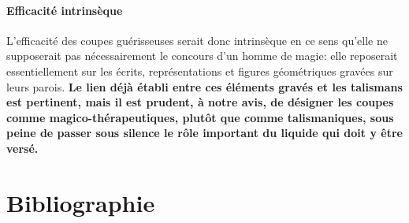 \paragraph{Efficacité intrinsèque}
L'efficacité des coupes guérisseuses serait donc intrinsèque en ce sens qu'elle ne supposerait pas nécessairement le concours d'un homme de magie: elle reposerait essentiellement sur les écrits, représentations et figures géométriques gravées sur leurs parois. \textbf{Le lien déjà établi entre ces éléments gravés et les talismans est pertinent, mais il est prudent, à notre avis, de désigner les coupes comme magico-thérapeutiques, plutôt que comme talismaniques, sous peine de passer sous silence le rôle important du liquide qui doit y être versé.}

\section{Bibliographie}
